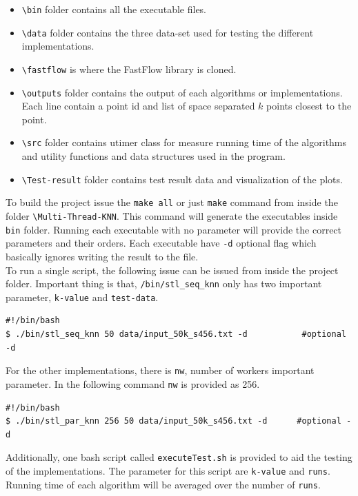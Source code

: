\documentclass[12pt,a4paper]{report}
\begin{document}
\begin{itemize}
  \item \verb|\bin| folder contains all the executable files.
  \item \verb|\data| folder contains the three data-set used for testing the different implementations.
  \item \verb|\fastflow| is where the FastFlow library is cloned.
  \item \verb|\outputs| folder contains the output of each algorithms or implementations. Each line contain a point id and list of space separated $k$ points closest to the point.
  \item \verb|\src| folder contains utimer class for measure running time of the algorithms and utility functions and data structures used in the program.
  \item \verb|\Test-result| folder contains test result data and visualization of the plots.
\end{itemize}

To build the project issue the \verb|make all| or just \verb|make| command from inside the folder \verb|\Multi-Thread-KNN|. This command will generate the executables inside \verb|bin| folder. Running each executable with no parameter will provide the correct parameters and their orders. Each executable have \verb|-d| optional flag which basically ignores writing the result to the file.\\

To run a single script, the following issue can be issued from inside the project folder. Important thing is that, \verb|/bin/stl_seq_knn| only has two important parameter, \verb|k-value| and \verb|test-data|.

\begin{verbatim}
#!/bin/bash
$ ./bin/stl_seq_knn 50 data/input_50k_s456.txt -d           #optional -d
\end{verbatim}

For the other implementations, there is \verb|nw|, number of workers important parameter. In the following command \verb|nw| is provided as 256. 

\begin{verbatim}
#!/bin/bash
$ ./bin/stl_par_knn 256 50 data/input_50k_s456.txt -d      #optional -d
\end{verbatim}

Additionally, one bash script called \verb|executeTest.sh| is provided to aid the testing of the implementations. The parameter for this script are \verb|k-value| and \verb|runs|. Running time of each algorithm will be averaged over the number of \verb|runs|.
\end{document}
